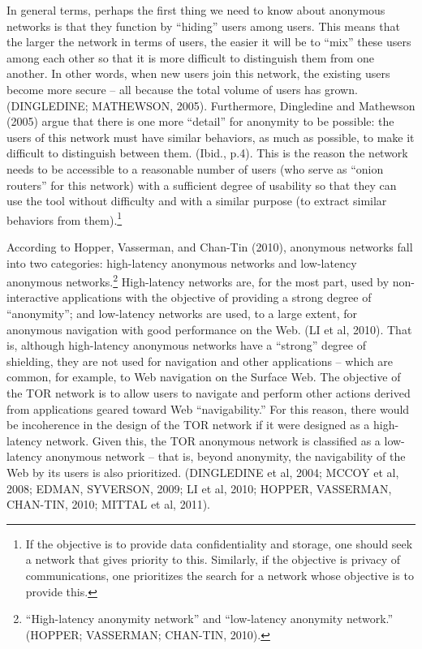 In general terms, perhaps the first thing we need to know about anonymous networks is that they function by ``hiding'' users among users. This means that the larger the network in terms of users, the easier it will be to ``mix'' these users among each other so that it is more difficult to distinguish them from one another. In other words, when new users join this network, the existing users become more secure -- all because the total volume of users has grown. (DINGLEDINE; MATHEWSON, 2005). Furthermore, Dingledine and Mathewson (2005) argue that there is one more ``detail'' for anonymity to be possible: the users of this network must have similar behaviors, as much as possible, to make it difficult to distinguish between them. (Ibid., p.4). This is the reason the network needs to be accessible to a reasonable number of users (who serve as ``onion routers'' for this network) with a sufficient degree of usability so that they can use the tool without difficulty and with a similar purpose (to extract similar behaviors from them).\footnote{If the objective is to provide data confidentiality and storage, one should seek a network that gives priority to this. Similarly, if the objective is privacy of communications, one prioritizes the search for a network whose objective is to provide this.}

According to Hopper, Vasserman, and Chan-Tin (2010), anonymous networks fall into two categories: high-latency anonymous networks and low-latency anonymous networks.\footnote{``High-latency anonymity network'' and ``low-latency anonymity network.'' (HOPPER; VASSERMAN; CHAN-TIN, 2010).} High-latency networks are, for the most part, used by non-interactive applications with the objective of providing a strong degree of ``anonymity''; and low-latency networks are used, to a large extent, for anonymous navigation with good performance on the Web. (LI et al, 2010). That is, although high-latency anonymous networks have a ``strong'' degree of shielding, they are not used for navigation and other applications -- which are common, for example, to Web navigation on the Surface Web. The objective of the TOR network is to allow users to navigate and perform other actions derived from applications geared toward Web ``navigability.'' For this reason, there would be incoherence in the design of the TOR network if it were designed as a high-latency network. Given this, the TOR anonymous network is classified as a low-latency anonymous network -- that is, beyond anonymity, the navigability of the Web by its users is also prioritized. (DINGLEDINE et al, 2004; MCCOY et al, 2008; EDMAN, SYVERSON, 2009; LI et al, 2010; HOPPER, VASSERMAN, CHAN-TIN, 2010; MITTAL et al, 2011).

